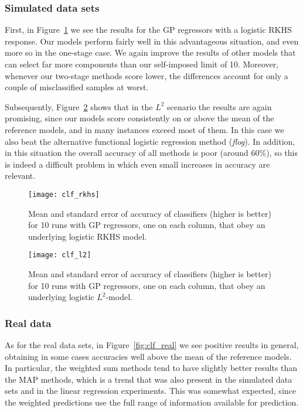 \documentclass{article}
\numberwithin{equation}{section}
\theoremstyle{plain}
\theoremstyle{definition}
\begin{document}
\subsubsection*{Simulated data sets}

First, in Figure~\ref{fig:clf_rkhs} we see the results for the GP regressors with a logistic RKHS response. Our models perform fairly well in this advantageous situation, and even more so in the one-stage case. We again improve the results of other models that can select far more components than our self-imposed limit of 10. Moreover, whenever our two-stage methods score lower, the differences account for only a couple of misclassified samples at worst.

Subsequently, Figure~\ref{fig:clf_l2} shows that in the \(L^2\) scenario the results are again promising, since our models score consistently on or above the mean of the reference models, and in many instances exceed most of them. In this case we also beat the alternative functional logistic regression method (\textit{flog}). In addition, in this situation the overall accuracy of all methods is poor (around 60\%), so this is indeed a difficult problem in which even small increases in accuracy are relevant.

\begin{figure}[ht!]
  \centering
  \texttt{[image: clf\_rkhs]}
  \caption{Mean and standard error of accuracy of classifiers (higher is better) for 10 runs with GP regressors, one on each column, that obey an underlying logistic RKHS model.}\label{fig:clf_rkhs}
\end{figure}

\begin{figure}[ht!]
  \vspace{2em}
  \centering
  \texttt{[image: clf\_l2]}
  \caption{Mean and standard error of accuracy of classifiers (higher is better) for 10 runs with GP regressors, one on each column, that obey an underlying logistic \(L^2\)-model.}\label{fig:clf_l2}
\end{figure}

\subsubsection*{Real data}

As for the real data sets, in Figure~\ref{fig:clf_real} we see positive results in general, obtaining in some cases accuracies well above the mean of the reference models. In particular, the weighted sum methods tend to have slightly better results than the MAP methods, which is a trend that was also present in the simulated data sets and in the linear regression experiments. This was somewhat expected, since the weighted predictions use the full range of information available for prediction.
\end{document}
